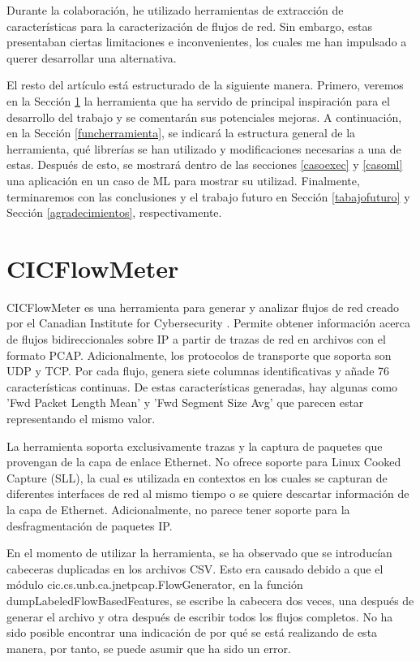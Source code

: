 \documentclass[10pt,a4paper,twoside]{article}
\begin{document}
\begin{multicols}{2}
    Durante la colaboración, he utilizado herramientas de extracción de características para la caracterización de flujos de red. Sin embargo, estas presentaban ciertas limitaciones e inconvenientes, los cuales me han impulsado a querer desarrollar una alternativa.

    El resto del artículo está estructurado de la siguiente manera. Primero, veremos en la Sección \ref{cicflowmeter} la herramienta que ha servido de principal inspiración para el desarrollo del trabajo y se comentarán sus potenciales mejoras. A continuación, en la Sección \ref{funcherramienta}, se indicará la estructura general de la herramienta, qué librerías se han utilizado y modificaciones necesarias a una de estas. Después de esto, se mostrará dentro de las secciones \ref{casoexec} y \ref{casoml} una aplicación en un caso de ML para mostrar su utilizad. Finalmente, terminaremos con las conclusiones y el trabajo futuro en Sección \ref{tabajofuturo} y Sección \ref{agradecimientos}, respectivamente.

    \section{CICFlowMeter} \label{cicflowmeter}

    CICFlowMeter es una herramienta para generar y analizar flujos de red creado por el Canadian Institute for Cybersecurity \cite{cicflowpost} \cite{icissp17} \cite{cicflowrepo}. Permite obtener información acerca de flujos bidireccionales sobre IP a partir de trazas de red en archivos con el formato PCAP. Adicionalmente, los protocolos de transporte que soporta son UDP y TCP. Por cada flujo, genera siete columnas identificativas y añade 76 características continuas. De estas características generadas, hay algunas como 'Fwd Packet Length Mean' y 'Fwd Segment Size Avg' que parecen estar representando el mismo valor.

    La herramienta soporta exclusivamente trazas y la captura de paquetes que provengan de la capa de enlace Ethernet. No ofrece soporte para Linux Cooked Capture (SLL), la cual es utilizada en contextos en los cuales se capturan de diferentes interfaces de red al mismo tiempo o se quiere descartar información de la capa de Ethernet. Adicionalmente, no parece tener soporte para la desfragmentación de paquetes IP.

    En el momento de utilizar la herramienta, se ha observado que se introducían cabeceras duplicadas en los archivos CSV. Esto era causado debido a que el módulo cic.cs.unb.ca.jnetpcap.FlowGenerator, en la función dumpLabeledFlowBasedFeatures, se escribe la cabecera dos veces, una después de generar el archivo y otra después de escribir todos los flujos completos. No ha sido posible encontrar una indicación de por qué se está realizando de esta manera, por tanto, se puede asumir que ha sido un error.


\end{multicols}
\end{document}
